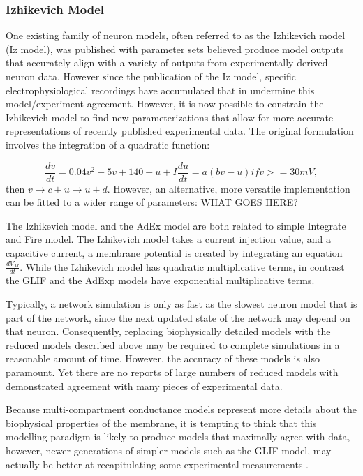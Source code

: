 \subsubsection{Izhikevich Model}
One existing family of neuron models, often referred to as the Izhikevich model \citep{izhikevich2003simple} (Iz model), was published with parameter sets believed produce model outputs that accurately align with a variety of outputs from experimentally derived neuron data. However since the publication of the Iz model, specific electrophysiological recordings have accumulated that in undermine this model/experiment agreement. However, it is now possible to constrain the Izhikevich model to find new parameterizations that allow for more accurate representations of recently published experimental data.
The original formulation involves the integration of a quadratic function:

\begin{displaymath}
\frac{dv}{dt}=0.04v^{2}+5v+140-u+I
\frac{du}{dt} = a(bv-u)
if v>=30mV,
\end{displaymath}
 then $ v \rightarrow c + u 	\rightarrow u+ d$.
However, an alternative, more versatile implementation can be fitted to a wider range of parameters:
WHAT GOES HERE?

The Izhikevich model and the AdEx model are both related to simple Integrate and Fire model.
The Izhikevich model takes a current injection value, and a capacitive current, a membrane potential is created by integrating an equation $\frac{dV_{M}}{dt}$.
While the Izhikevich model has quadratic multiplicative terms, in contrast the GLIF and the AdExp models have exponential multiplicative terms.

Typically, a network simulation is only as fast as the slowest neuron model that is part of the network, since the next updated state of the network may depend on that neuron.
Consequently, replacing biophysically detailed models with the reduced models described above may be required to complete simulations in a reasonable amount of time.
However, the accuracy of these models is also paramount.
Yet there are no reports of large numbers of reduced models with demonstrated agreement with many pieces of experimental data.

Because multi-compartment conductance models represent more details about the biophysical properties of the membrane, it is tempting to think that this modelling paradigm is likely to produce models that maximally agree with data, however, newer generations of simpler models such as the GLIF model, may actually be better at recapitulating some experimental measurements \citep{meunier2002playing}.

